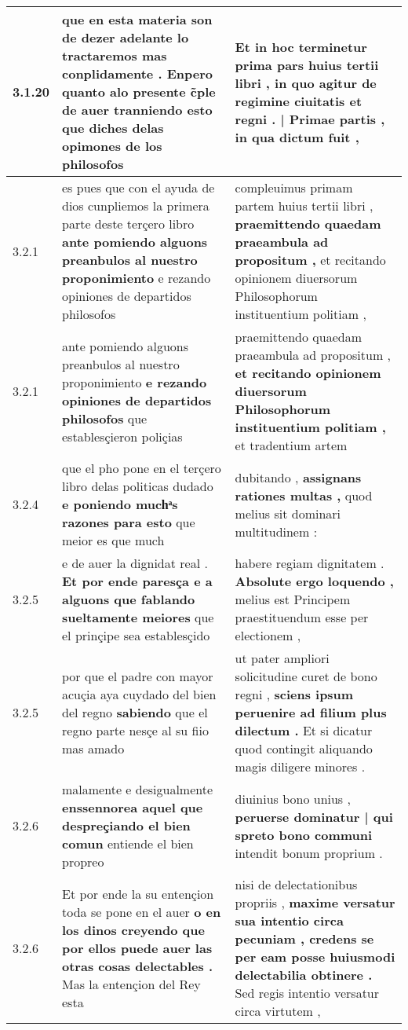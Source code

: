 \begin{tabular}{|p{1cm}|p{6.5cm}|p{6.5cm}|}
3.1.20 & que en esta materia son de dezer adelante lo tractaremos mas conplidamente . \textbf{ Enpero quanto alo presente c̃ple de auer tranniendo esto } que diches delas opimones de los philosofos & Et in hoc terminetur prima pars huius tertii libri , \textbf{ in quo agitur de regimine ciuitatis et regni . | Primae partis , } in qua dictum fuit , \\\hline
3.2.1 & es pues que con el ayuda de dios cunpliemos la primera parte deste terçero libro \textbf{ ante pomiendo alguons preanbulos al nuestro proponimiento } e rezando opiniones de departidos philosofos & compleuimus primam partem huius tertii libri , \textbf{ praemittendo quaedam praeambula ad propositum , } et recitando opinionem diuersorum Philosophorum instituentium politiam , \\\hline
3.2.1 & ante pomiendo alguons preanbulos al nuestro proponimiento \textbf{ e rezando opiniones de departidos philosofos } que establesçieron poliçias & praemittendo quaedam praeambula ad propositum , \textbf{ et recitando opinionem diuersorum Philosophorum instituentium politiam , } et tradentium artem \\\hline
3.2.4 & que el pho pone en el terçero libro delas politicas dudado \textbf{ e poniendo muchͣs razones para esto } que meior es que much & dubitando , \textbf{ assignans rationes multas , } quod melius sit dominari multitudinem : \\\hline
3.2.5 & e de auer la dignidat real . \textbf{ Et por ende paresça e a alguons que fablando sueltamente meiores } que el prinçipe sea establesçido & habere regiam dignitatem . \textbf{ Absolute ergo loquendo , } melius est Principem praestituendum esse per electionem , \\\hline
3.2.5 & por que el padre con mayor acuçia aya cuydado del bien del regno \textbf{ sabiendo } que el regno parte nesçe al su fiio mas amado & ut pater ampliori solicitudine curet de bono regni , \textbf{ sciens ipsum peruenire ad filium plus dilectum . } Et si dicatur quod contingit aliquando magis diligere minores . \\\hline
3.2.6 & malamente e desigualmente \textbf{ enssennorea aquel que despreçiando el bien comun } entiende el bien propreo & diuinius bono unius , \textbf{ peruerse dominatur | qui spreto bono communi } intendit bonum proprium . \\\hline
3.2.6 & Et por ende la su entençion toda se pone en el auer \textbf{ o en los dinos creyendo que por ellos puede auer las otras cosas delectables . } Mas la entençion del Rey esta & nisi de delectationibus propriis , \textbf{ maxime versatur sua intentio circa pecuniam , credens se per eam posse huiusmodi delectabilia obtinere . } Sed regis intentio versatur circa virtutem , \\\hline

\end{tabular}
